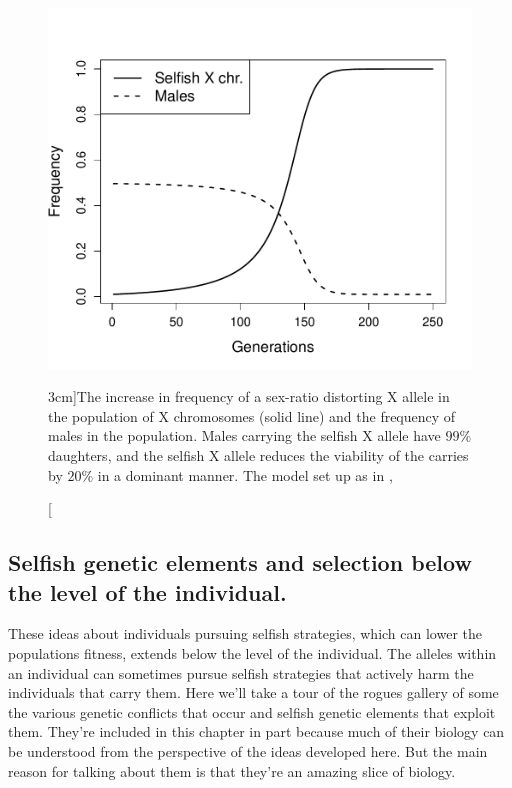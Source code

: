 {\begin{figure}
\begin{center}
\includegraphics[width= \textwidth]{figures/sex_ratio_distortor.pdf}

\end{center}
\caption[][3cm]{The increase in frequency of a sex-ratio distorting X allele in the population of
  X chromosomes (solid line) and the frequency of males in the
  population. Males carrying the selfish X allele have $99\%$
  daughters, and the selfish X allele reduces the viability of the
  carries by $20\%$ in a dominant manner. The model set up as in \citet{edwards1961population}, } \label{fig:selfish_X_freqs}
\end{figure}

\subsection{Selfish genetic elements and selection below the level of
  the individual.}

These ideas about individuals pursuing selfish strategies, which can
lower the populations fitness, extends below the level of the individual. The alleles within an
individual can sometimes pursue selfish strategies that
actively harm the individuals that carry them. Here we'll take a tour
of the rogues gallery of some the various
genetic conflicts that occur and selfish genetic elements that exploit
them. They're included in this chapter in part because much of their biology can
be understood from the perspective of the ideas developed here. But the main reason for talking about them is that they're an
amazing slice of biology. %


}
